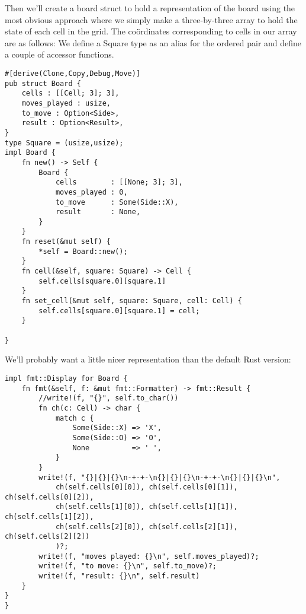 \documentclass[10pt,dvipdfmx]{report}
\newcommand{\g}[1]{{\sc{#1}}\index{{\sc{#1}}}}
\begin{document}
Then we'll create a board struct to hold a representation of the board using
the most obvious approach where we simply make a three-by-three array to hold the
state of each cell in the \g{tic-tac-toe} grid.  The co\"ordinates corresponding to cells in our array
are as follows:
{\tiny{}}
We define a Square type as an alias for the ordered pair and define a couple of accessor functions.
{\scriptsize\begin{verbatim}
#[derive(Clone,Copy,Debug,Move)]
pub struct Board {
    cells : [[Cell; 3]; 3],
    moves_played : usize,
    to_move : Option<Side>,
    result : Option<Result>,
}
type Square = (usize,usize);
impl Board {
    fn new() -> Self {
        Board {
            cells        : [[None; 3]; 3],
            moves_played : 0,
            to_move      : Some(Side::X),
            result       : None,
        }
    }
    fn reset(&mut self) {
        *self = Board::new();
    }
    fn cell(&self, square: Square) -> Cell {
        self.cells[square.0][square.1]
    }
    fn set_cell(&mut self, square: Square, cell: Cell) {
        self.cells[square.0][square.1] = cell;
    }

}
\end{verbatim}}
We'll probably want a little nicer representation than the default Rust version:
{\scriptsize\begin{verbatim}
impl fmt::Display for Board {
    fn fmt(&self, f: &mut fmt::Formatter) -> fmt::Result {
        //write!(f, "{}", self.to_char())
        fn ch(c: Cell) -> char {
            match c {
                Some(Side::X) => 'X',
                Some(Side::O) => 'O',
                None          => ' ',
            }
        }
        write!(f, "{}|{}|{}\n-+-+-\n{}|{}|{}\n-+-+-\n{}|{}|{}\n",
            ch(self.cells[0][0]), ch(self.cells[0][1]), ch(self.cells[0][2]),
            ch(self.cells[1][0]), ch(self.cells[1][1]), ch(self.cells[1][2]),
            ch(self.cells[2][0]), ch(self.cells[2][1]), ch(self.cells[2][2])
            )?;
        write!(f, "moves played: {}\n", self.moves_played)?;
        write!(f, "to move: {}\n", self.to_move)?;
        write!(f, "result: {}\n", self.result)
    }
}
}
\end{verbatim}}
\end{document}

